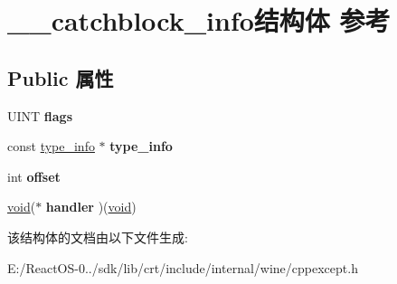 \hypertarget{struct____catchblock__info}{}\section{\+\_\+\+\_\+catchblock\+\_\+info结构体 参考}
\label{struct____catchblock__info}
\subsection*{Public 属性}
\begin{DoxyCompactItemize}
\item 
\mbox{\label{struct____catchblock__info_afda8ccf62573c5ff3c46564c7976dd26}} 
U\+I\+NT {\bfseries flags}
\item 
\mbox{\label{struct____catchblock__info_a688354db163c4b66f81096421354ae98}} 
const \hyperlink{struct____type__info}{type\+\_\+info} $\ast$ {\bfseries type\+\_\+info}
\item 
\mbox{\label{struct____catchblock__info_a6fd4a7ef39d63c1690d0489746088b00}} 
int {\bfseries offset}
\item 
\mbox{\label{struct____catchblock__info_ae150a5845f21d2b911e97b68ac4b0900}} 
\hyperlink{interfacevoid}{void}($\ast$ {\bfseries handler} )(\hyperlink{interfacevoid}{void})
\end{DoxyCompactItemize}


该结构体的文档由以下文件生成\+:\begin{DoxyCompactItemize}
\item 
E\+:/\+React\+O\+S-\/0../sdk/lib/crt/include/internal/wine/cppexcept.\+h\end{DoxyCompactItemize}
